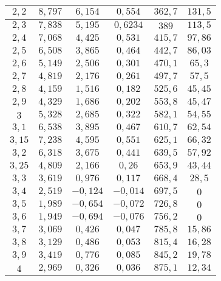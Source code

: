 \begin{tabular}{| c | c | c | c | c | c |}
\hline
$2,2$ & $8,797$ & $6,154$ & $0,554$ & $362,7$ & $131,5$\\
\hline
$2,3$ & $7,838$ & $5,195$ & $0,6234$ & $389$ & $113,5$\\
\hline
$2,4$ & $7,068$ & $4,425$ & $0,531$ & $415,7$ & $97,86$\\
\hline
$2,5$ & $6,508$ & $3,865$ & $0,464$ & $442,7$ & $86,03$\\
\hline
$2,6$ & $5,149$ & $2,506$ & $0,301$ & $470,1$ & $65,3$\\
\hline
$2,7$ & $4,819$ & $2,176$ & $0,261$ & $497,7$ & $57,5$\\
\hline
$2,8$ & $4,159$ & $1,516$ & $0,182$ & $525,6$ & $45,45$\\
\hline
$2,9$ & $4,329$ & $1,686$ & $0,202$ & $553,8$ & $45,47$\\
\hline
$3$ & $5,328$ & $2,685$ & $0,322$ & $582,1$ & $54,55$\\
\hline
$3,1$ & $6,538$ & $3,895$ & $0,467$ & $610,7$ & $62,54$\\
\hline
$3,15$ & $7,238$ & $4,595$ & $0,551$ & $625,1$ & $66,32$\\
\hline
$3,2$ & $6,318$ & $3,675$ & $0,441$ & $639,5$ & $57,92$\\
\hline
$3,25$ & $4,809$ & $2,166$ & $0,26$ & $653,9$ & $43,44$\\
\hline
$3,3$ & $3,619$ & $0,976$ & $0,117$ & $668,4$ & $28,5$\\
\hline
$3,4$ & $2,519$ & $-0,124$ & $-0,014$ & $697,5$ & $0$\\
\hline
$3,5$ & $1,989$ & $-0,654$ & $-0,072$ & $726,8$ & $0$\\
\hline
$3,6$ & $1,949$ & $-0,694$ & $-0,076$ & $756,2$ & $0$\\
\hline
$3,7$ & $3,069$ & $0,426$ & $0,047$ & $785,8$ & $15,86$\\
\hline
$3,8$ & $3,129$ & $0,486$ & $0,053$ & $815,4$ & $16,28$\\
\hline
$3,9$ & $3,419$ & $0,776$ & $0,085$ & $845,2$ & $19,78$\\
\hline
$4$ & $2,969$ & $0,326$ & $0,036$ & $875,1$ & $12,34$\\
\hline
\end{tabular}
